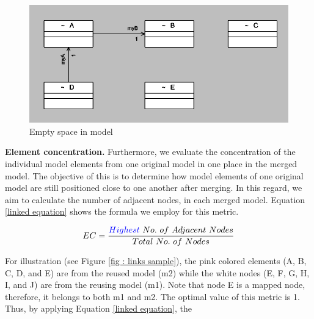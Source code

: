 \begin{figure}
\includegraphics[width=\linewidth]{Evaluation/evaluationfig.PNG}
	\caption{Empty space in model}
	\label{fig : evaluation}
\end{figure}

\textbf{Element concentration.} Furthermore, we evaluate the concentration of the individual model elements from one original model in one place in the merged model. The objective of this is to determine how model elements of one original model are still positioned close to one another after merging. In this regard, we aim to calculate the  number of adjacent nodes,  in each merged model. Equation \ref{linked equation} shows the formula we employ for this metric.

\begin{equation} \label{linked equation}
  EC = \frac{\haAction{Highest}\ No.\ of\ Adjacent\ Nodes}{Total\ No.\ of\ Nodes}
\end{equation}

For illustration (see Figure \ref{fig : links sample}), the pink colored elements (A, B, C, D, and E) are from the reused model (m2) while the white nodes (E, F, G, H, I, and J) are from the reusing model (m1). Note that node E is a mapped node, therefore, it belongs to both m1 and m2. The optimal value of this metric is 1. Thus, by applying Equation \ref{linked equation}, the   


